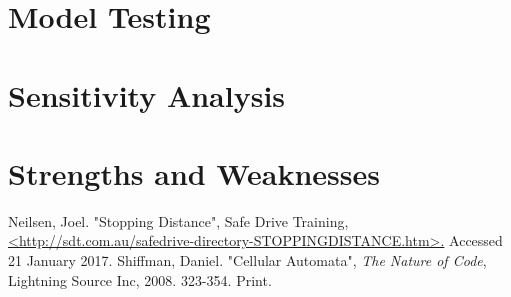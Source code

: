 \documentclass[a4paper]{article}
\begin{document}
	\subsubsection{}




	\section{Model Testing}
	\section{Sensitivity Analysis}
	\section{Strengths and Weaknesses}







	\begin{thebibliography}{0}
		 Neilsen, Joel. "Stopping Distance", Safe Drive Training,  \url{<http://sdt.com.au/safedrive-directory-STOPPINGDISTANCE.htm>.} Accessed 21 January 2017.
		\bibitem{} Shiffman, Daniel. "Cellular Automata", \textit{The Nature of Code}, Lightning Source Inc, 2008. 323-354. Print.
	\end{thebibliography}
\end{document}
